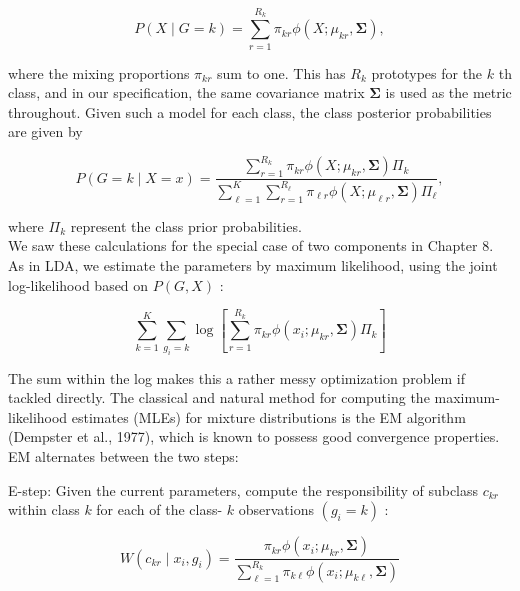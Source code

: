 \documentclass[10pt]{article}
\begin{document}
\begin{equation*}
P(X \mid G=k)=\sum_{r=1}^{R_{k}} \pi_{k r} \phi\left(X ; \mu_{k r}, \boldsymbol{\Sigma}\right), \tag{12.59}
\end{equation*}


where the mixing proportions $\pi_{k r}$ sum to one. This has $R_{k}$ prototypes for the $k$ th class, and in our specification, the same covariance matrix $\boldsymbol{\Sigma}$ is used as the metric throughout. Given such a model for each class, the class posterior probabilities are given by


\begin{equation*}
P(G=k \mid X=x)=\frac{\sum_{r=1}^{R_{k}} \pi_{k r} \phi\left(X ; \mu_{k r}, \boldsymbol{\Sigma}\right) \Pi_{k}}{\sum_{\ell=1}^{K} \sum_{r=1}^{R_{\ell}} \pi_{\ell r} \phi\left(X ; \mu_{\ell r}, \boldsymbol{\Sigma}\right) \Pi_{\ell}}, \tag{12.60}
\end{equation*}


where $\Pi_{k}$ represent the class prior probabilities.\\
We saw these calculations for the special case of two components in Chapter 8. As in LDA, we estimate the parameters by maximum likelihood, using the joint log-likelihood based on $P(G, X)$ :


\begin{equation*}
\sum_{k=1}^{K} \sum_{g_{i}=k} \log \left[\sum_{r=1}^{R_{k}} \pi_{k r} \phi\left(x_{i} ; \mu_{k r}, \boldsymbol{\Sigma}\right) \Pi_{k}\right] \tag{12.61}
\end{equation*}


The sum within the log makes this a rather messy optimization problem if tackled directly. The classical and natural method for computing the maximum-likelihood estimates (MLEs) for mixture distributions is the EM algorithm (Dempster et al., 1977), which is known to possess good convergence properties. EM alternates between the two steps:

E-step: Given the current parameters, compute the responsibility of subclass $c_{k r}$ within class $k$ for each of the class- $k$ observations $\left(g_{i}=k\right)$ :


\begin{equation*}
W\left(c_{k r} \mid x_{i}, g_{i}\right)=\frac{\pi_{k r} \phi\left(x_{i} ; \mu_{k r}, \boldsymbol{\Sigma}\right)}{\sum_{\ell=1}^{R_{k}} \pi_{k \ell} \phi\left(x_{i} ; \mu_{k \ell}, \boldsymbol{\Sigma}\right)} \tag{12.62}
\end{equation*}
\end{document}
